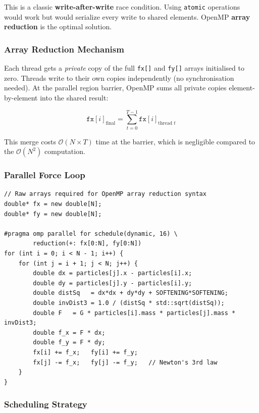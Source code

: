 ﻿\documentclass[12pt,a4paper]{article}
\begin{document}
This is a classic \textbf{write-after-write} race condition. Using
\texttt{atomic} operations would work but would serialize every write to
shared elements. OpenMP \textbf{array reduction} is the optimal solution.

\subsubsection*{Array Reduction Mechanism}

Each thread gets a \emph{private} copy of the full \texttt{fx[]} and
\texttt{fy[]} arrays initialised to zero. Threads write to their own
copies independently (no synchronisation needed). At the parallel region
barrier, OpenMP sums all private copies element-by-element into the
shared result:

\begin{equation}
    \texttt{fx}[i]_{\text{final}} = \sum_{t=0}^{T-1} \texttt{fx}[i]_{\text{thread } t}
\end{equation}

This merge costs $\mathcal{O}(N \times T)$ time at the barrier, which is
negligible compared to the $\mathcal{O}(N^2)$ computation.

\subsubsection*{Parallel Force Loop}

\begin{lstlisting}
// Raw arrays required for OpenMP array reduction syntax
double* fx = new double[N];
double* fy = new double[N];

#pragma omp parallel for schedule(dynamic, 16) \
        reduction(+: fx[0:N], fy[0:N])
for (int i = 0; i < N - 1; i++) {
    for (int j = i + 1; j < N; j++) {
        double dx = particles[j].x - particles[i].x;
        double dy = particles[j].y - particles[i].y;
        double distSq   = dx*dx + dy*dy + SOFTENING*SOFTENING;
        double invDist3 = 1.0 / (distSq * std::sqrt(distSq));
        double F   = G * particles[i].mass * particles[j].mass * invDist3;
        double f_x = F * dx;
        double f_y = F * dy;
        fx[i] += f_x;   fy[i] += f_y;
        fx[j] -= f_x;   fy[j] -= f_y;   // Newton's 3rd law
    }
}
\end{lstlisting}

\subsubsection*{Scheduling Strategy}
\end{document}

